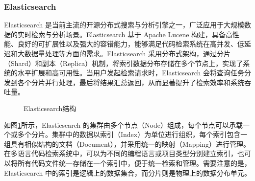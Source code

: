 \documentclass[UTF8,a4paper,12pt]{ctexart}
\numberwithin{equation}{section}
\begin{document}
\subsubsection{Elasticsearch}

Elasticsearch\cite{ref13} 是当前主流的开源分布式搜索与分析引擎之一，广泛应用于大规模数据的实时检索与分析场景。Elasticsearch 基于 Apache Lucene 构建，具备高性能、良好的可扩展性以及强大的容错能力，能够满足代码检索系统在高并发、低延迟和大数据量处理等方面的需求。Elasticsearch 采用分布式架构，通过分片（Shard）和副本（Replica）机制，将索引数据分布存储在多个节点上，实现了系统的水平扩展和高可用性。当用户发起检索请求时，Elasticsearch 会将查询任务分发到各个分片并行处理，最后将结果汇总返回，从而显著提升了检索效率和系统吞吐量。\par

\begin{figure}[H]
	\caption{Elasticsearch结构}
	\label{es}
\end{figure}

如图\ref{es}所示，Elasticsearch 的集群由多个节点（Node）组成，每个节点可以承载一个或多个分片。集群中的数据以索引（Index）为单位进行组织，每个索引包含一组具有相似结构的文档（Document），并采用统一的映射（Mapping）进行管理。在多语言代码检索系统中，可以为不同的编程语言或项目类型分别建立索引，也可以将所有代码文件统一存储在一个索引中，便于统一检索和管理。需要注意的是，Elasticsearch 中的索引是逻辑上的数据集合，而分片则是物理上的数据分布单元。\par
\end{document}
